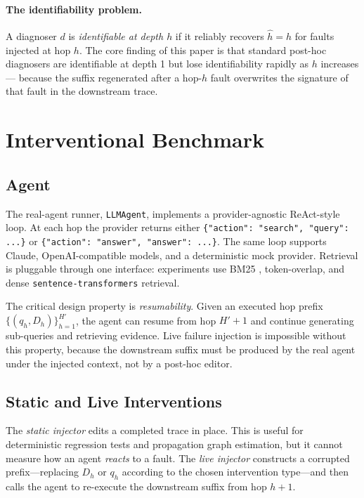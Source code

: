 \documentclass[11pt]{article}
\begin{document}
\paragraph{The identifiability problem.}
A diagnoser $d$ is \emph{identifiable at depth $h$} if it reliably recovers
$\hat{h} = h$ for faults injected at hop $h$.  The core finding of this paper
is that standard post-hoc diagnosers are identifiable at depth 1 but lose
identifiability rapidly as $h$ increases --- because the suffix regenerated after
a hop-$h$ fault overwrites the signature of that fault in the downstream trace.

\section{Interventional Benchmark}

\subsection{Agent}

The real-agent runner, \texttt{LLMAgent}, implements a provider-agnostic
ReAct-style loop.  At each hop the provider returns either
\verb|{"action": "search", "query": ...}| or
\verb|{"action": "answer", "answer": ...}|.  The same loop supports Claude,
OpenAI-compatible models, and a deterministic mock provider.  Retrieval is
pluggable through one interface: experiments use BM25
\citep{robertson2009bm25}, token-overlap, and dense
\texttt{sentence-transformers} retrieval.

The critical design property is \emph{resumability}.  Given an executed hop
prefix $\{(q_h, D_h)\}_{h=1}^{H'}$, the agent can resume from hop $H'+1$ and
continue generating sub-queries and retrieving evidence.  Live failure injection
is impossible without this property, because the downstream suffix must be
produced by the real agent under the injected context, not by a post-hoc
editor.

\subsection{Static and Live Interventions}
\label{sec:interventions}

The \emph{static injector} edits a completed trace in place.  This is useful
for deterministic regression tests and propagation graph estimation, but it
cannot measure how an agent \emph{reacts} to a fault.  The \emph{live
injector} constructs a corrupted prefix---replacing $D_h$ or $q_h$ according
to the chosen intervention type---and then calls the agent to re-execute the
downstream suffix from hop $h{+}1$.
\end{document}
